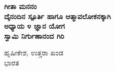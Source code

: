 \begin{titlepage}
    \begin{center}
        \vspace*{0.5cm}
            
        {\Huge
        \textbf{\color{blue}\fontsize{50}{60}\selectfont ಗೀತಾ ಮನನಂ}}
        \textbf{\\ \small \color{black}ದೈನಂದಿನ ಸ್ಪೂರ್ತಿ ಹಾಗೂ ಆತ್ಮಾವಲೋಕನಕ್ಕಾಗಿ}\\    
        \vspace{1.0cm}
		    \textbf{{\large \color{black} ಅಧ್ಯಾಯ ೪ ಜ್ಞಾನ ಯೋಗ}}\\		
        \vspace{6.0cm}
        \textbf{{\Large \color{blue}\mananamfont ಸ್ವಾಮಿ ನಿರ್ಗುಣಾನಂದ ಗಿರಿ}}\\    
        
		
            
        \vfill
            
        
            
        \vspace{0.1cm}
        {\color{black}    
		
		{{\large \color{blue}ಹೃಷೀಕೇಶ, ಉತ್ತರಾ ಖಂಡ}\\\normalsize ಭಾರತ}
        }
    \end{center}
\end{titlepage}
\nopagecolor%